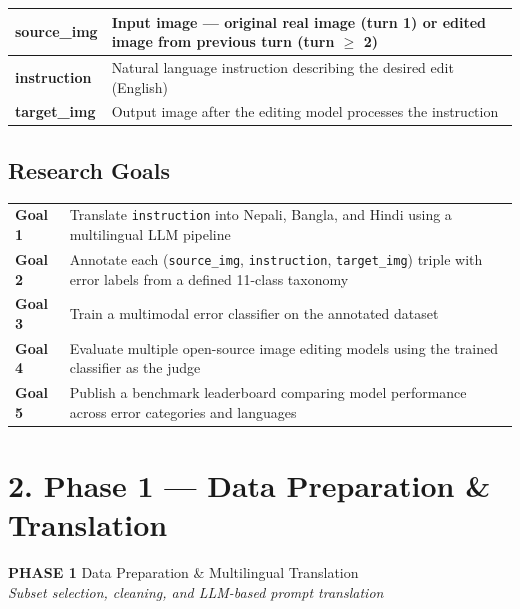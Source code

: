 \documentclass[11pt,a4paper]{article}
\begin{document}
\vspace{6pt}
\begin{tabularx}{\textwidth}{>{\bfseries}lX}
\toprule
source\_img & Input image — original real image (turn 1) or edited image from previous turn (turn $\geq$ 2) \\
\midrule
instruction & Natural language instruction describing the desired edit (English) \\
\midrule
target\_img & Output image after the editing model processes the instruction \\
\bottomrule
\end{tabularx}

\subsection{Research Goals}

\begin{tabularx}{\textwidth}{>{\centering\bfseries\arraybackslash\columncolor{phaseblue}\color{white}}p{1.5cm}X}
\toprule
Goal 1 & Translate \texttt{instruction} into Nepali, Bangla, and Hindi using a multilingual LLM pipeline \\[4pt]
\rowcolor{lightgray}
\textbf{Goal 2} & Annotate each (\texttt{source\_img}, \texttt{instruction}, \texttt{target\_img}) triple with error labels from a defined 11-class taxonomy \\[4pt]
Goal 3 & Train a multimodal error classifier on the annotated dataset \\[4pt]
\rowcolor{lightgray}
\textbf{Goal 4} & Evaluate multiple open-source image editing models using the trained classifier as the judge \\[4pt]
Goal 5 & Publish a benchmark leaderboard comparing model performance across error categories and languages \\
\bottomrule
\end{tabularx}

\section{2. Phase 1 — Data Preparation \& Translation}

\begin{phasebox}
\textbf{PHASE 1} \quad Data Preparation \& Multilingual Translation\\
\textit{Subset selection, cleaning, and LLM-based prompt translation}
\end{phasebox}
\end{document}
